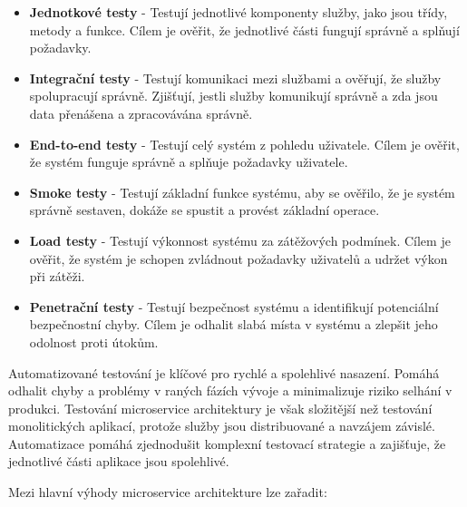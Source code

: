 \begin{itemize}
    \item \textbf{Jednotkové testy} - Testují jednotlivé komponenty služby, jako jsou třídy, metody a funkce. Cílem je ověřit, že jednotlivé části fungují správně a splňují požadavky.
    \item \textbf{Integrační testy} - Testují komunikaci mezi službami a ověřují, že služby spolupracují správně. Zjišťují, jestli služby komunikují správně a zda jsou data přenášena a zpracovávána správně.
    \item \textbf{End-to-end testy} - Testují celý systém z pohledu uživatele. Cílem je ověřit, že systém funguje správně a splňuje požadavky uživatele.
    \item \textbf{Smoke testy} - Testují základní funkce systému, aby se ověřilo, že je systém správně sestaven, dokáže se spustit a provést základní operace.
    \item \textbf{Load testy} - Testují výkonnost systému za zátěžových podmínek. Cílem je ověřit, že systém je schopen zvládnout požadavky uživatelů a udržet výkon při zátěži.
    \item \textbf{Penetrační testy} - Testují bezpečnost systému a identifikují potenciální bezpečnostní chyby. Cílem je odhalit slabá místa v systému a zlepšit jeho odolnost proti útokům.
\end{itemize}

Automatizované testování je klíčové pro rychlé a spolehlivé nasazení. Pomáhá odhalit chyby a problémy v raných fázích vývoje a minimalizuje riziko selhání v produkci. Testování microservice architektury je však složitější než testování monolitických aplikací, protože služby jsou distribuované a navzájem závislé. Automatizace pomáhá zjednodušit komplexní testovací strategie a zajišťuje, že jednotlivé části aplikace jsou spolehlivé. \cite{Newman2015}


Mezi hlavní výhody microservice architekture lze zařadit:


